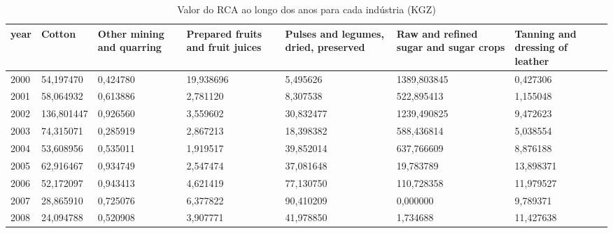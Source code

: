 \begin{table}
\centering
\caption{Valor do RCA ao longo dos anos para cada indústria (KGZ)}
\begin{tabular}{p{1cm}p{2cm}p{2cm}p{2cm}p{2cm}p{2cm}p{2cm}}
\toprule
 year &     Cotton &  Other mining and quarring &  Prepared fruits and fruit juices &  Pulses and legumes, dried, preserved &  Raw and refined sugar and sugar crops &  Tanning and dressing of leather \\
\midrule
 2000 &  54,197470 &                   0,424780 &                         19,938696 &                              5,495626 &                            1389,803845 &                         0,427306 \\
 2001 &  58,064932 &                   0,613886 &                          2,781120 &                              8,307538 &                             522,895413 &                         1,155048 \\
 2002 & 136,801447 &                   0,926560 &                          3,559602 &                             30,832477 &                            1239,490825 &                         9,472623 \\
 2003 &  74,315071 &                   0,285919 &                          2,867213 &                             18,398382 &                             588,436814 &                         5,038554 \\
 2004 &  53,608956 &                   0,535011 &                          1,919517 &                             39,852014 &                             637,766609 &                         8,876188 \\
 2005 &  62,916467 &                   0,934749 &                          2,547474 &                             37,081648 &                              19,783789 &                        13,898371 \\
 2006 &  52,172097 &                   0,943413 &                          4,621419 &                             77,130750 &                             110,728358 &                        11,979527 \\
 2007 &  28,865910 &                   0,725076 &                          6,377822 &                             90,410209 &                               0,000000 &                         9,789371 \\
 2008 &  24,094788 &                   0,520908 &                          3,907771 &                             41,978850 &                               1,734688 &                        11,427638 \\

\end{tabular}
\end{table}
